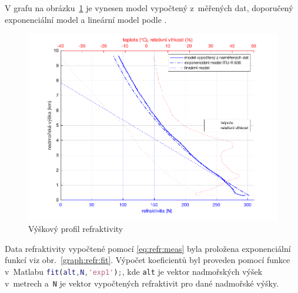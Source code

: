 \documentclass[twoside]{ctuthesis}
\theoremstyle{plain}
\theoremstyle{definition}
\theoremstyle{note}
\begin{document}
	V grafu na obrázku~\ref{graph:refr} je vynesen model vypočtený z~měřených dat, doporučený exponenciální model a lineární model podle \cite{zaklady:sireni:vln}.
	\begin{figure}[hbtp]
		\centering
		\includegraphics[width=.7\textwidth]{Graphs/refractivity_exp_lin_meas_hum.pdf}
		\caption{Výškový profil refraktivity}
		\label{graph:refr}
	\end{figure}

	Data refraktivity vypočtené pomocí \eqref{eq:refr:meas} byla proložena exponenciální funkcí viz obr.~\ref{graph:refr:fit}. Výpočet koeficientů byl proveden pomocí funkce v~Matlabu \lstinline[language=Matlab]|fit(alt,N,'exp1');|, kde \lstinline|alt| je vektor nadmořských výšek v~metrech a~\lstinline|N| je vektor vypočtených refraktivit pro dané nadmořské výšky.
\end{document}
